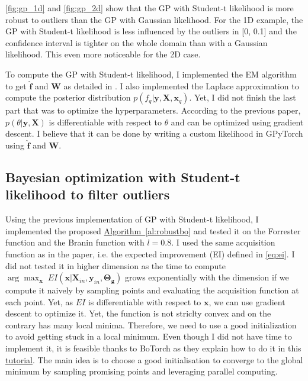 \documentclass{article}
\newcommand{\x}{\mathbf{x}}
\newcommand{\y}{\mathbf{y}}
\newcommand{\f}{\mathbf{f}}
\newcommand{\algoref}[1]{\hyperref[#1]{Algorithm~\ref{#1}}}
\newcommand{\X}{\mathbf{X}}
\begin{document}
\ref{fig:gp_1d} and \ref{fig:gp_2d} show that the GP with Student-t likelihood is more robust to outliers than the GP with Gaussian likelihood. For the 1D example, the GP with Student-t likelihood is less influenced by the outliers in [0, 0.1] and the confidence interval is tighter on the whole domain than with a Gaussian likelihood. This even more noticeable for the 2D case.

To compute the GP with Student-t likelihood, I implemented the EM algorithm to get $\hat{\f}$ and $\mathbf{W}$ as detailed in \cite{NIPS2009_13fe9d84}. I also implemented the Laplace approximation to compute the posterior distribution $p(f_q | \y, \X, \x_q)$. Yet, I did not finish the last part that was to optimize the hyperparameters. According to the previous paper, $p(\theta | \y, \X)$ is differentiable with respect to $\theta$ and can be optimized using gradient descent. I believe that it can be done by writing a custom likelihood in \textrm{GPyTorch} using $\hat{\f}$ and $\mathbf{W}$.



\subsection{Bayesian optimization with Student-t likelihood to filter outliers}

Using the previous implementation of GP with Student-t likelihood, I implemented the proposed \algoref{al:robustbo} and tested it on the Forrester function and the Branin function with $l=0.8$. I used the same acquisition function as in the paper, i.e. the expected improvement (EI) defined in \eqref{eq:ei}. I did not tested it in higher dimension as the time to compute $\arg \max_{\x} \; EI(\x | \X_{in}, \y_{in},\mathbf{\Theta_g})$ grows exponentially with the dimension if we compute it naively by sampling points and evaluating the acquisition function at each point. Yet, as $EI$ is differentiable with respect to $\x$, we can use gradient descent to optimize it. Yet, the function is not striclty convex and on the contrary has many local minima. Therefore, we need to use a good initialization to avoid getting stuck in a local minimum. Even though I did not have time to implement it, it is feasible thanks to \textrm{BoTorch} as they explain how to do it in this \href{https://botorch.org/v/0.1.2/tutorials/optimize_stochastic}{tutorial}. The main idea is to choose a good initialisation to converge to the global minimum by sampling promising points and leveraging parallel computing.
\end{document}
